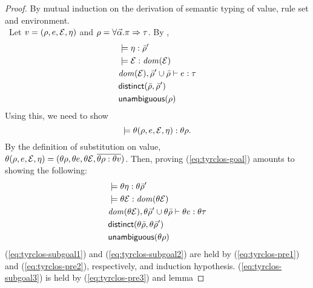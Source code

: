 \begin{proof} By mutual induction on the derivation of semantic typing
  of value, rule set and environment.
  \\
  \case \TyRClos~Let $v = (\rho, e, \mathcal{E}, \eta)$ and
  $\rho = \forall \vec{\alpha}. \pi \Rightarrow \tau$. By \TyRClos,
  \begin{align}
    \label{eq:tyrclos-pre1}
    & \models \eta:\bar{\rho}' \\
    \label{eq:tyrclos-pre2}
    & \models \mathcal{E}:{\it dom }(\mathcal{E}) \\
    \label{eq:tyrclos-pre3}
    & {\it dom }(\mathcal{E}), \bar{\rho}' \cup \bar{\rho} \vdash
    e:\tau \\
    \label{eq:tyrclos-pre4}
    & {\sf distinct}(\bar{\rho}, \bar{\rho}') \\  
    \label{eq:tyrclos-pre5}
    & {\sf unambiguous}(\rho)
  \end{align}
  Using this, we need to show
  \begin{equation}
    \label{eq:tyrclos-goal}
    \models 
    \theta (\rho, e, \mathcal{E}, \eta):\theta \rho.
  \end{equation}
  By the definition of substitution on value, \\
  $\theta (\rho,
    e, \mathcal{E}, \eta) = (\theta \rho, \theta e, \theta
    \mathcal{E}, \overline{\theta \rho:\theta v})$. Then, proving
  (\ref{eq:tyrclos-goal}) amounts to showing the following:
  \begin{align}
    \label{eq:tyrclos-subgoal1}
    & \models \theta \eta:\theta \bar{\rho}' \\
    \label{eq:tyrclos-subgoal2}
    & \models \theta \mathcal{E}:{\it dom }(\theta \mathcal{E}) \\
    \label{eq:tyrclos-subgoal3}
    & {\it dom }(\theta \mathcal{E}), \theta \bar{\rho}' \cup \theta \bar{\rho} 
    \vdash \theta e:\theta \tau \\
    \label{eq:tyrclos-subgoal4}
    & {\sf distinct}(\theta \bar{\rho}, \theta \bar{\rho}') \\  
    \label{eq:tyrclos-subgoal5}
    & {\sf unambiguous}(\theta \rho)
  \end{align}
  (\ref{eq:tyrclos-subgoal1}) and (\ref{eq:tyrclos-subgoal2}) are held
  by (\ref{eq:tyrclos-pre1}) and (\ref{eq:tyrclos-pre2}),
  respectively, and induction hypothesis. (\ref{eq:tyrclos-subgoal3}) is
  held by (\ref{eq:tyrclos-pre3}) and lemma

\end{proof}
